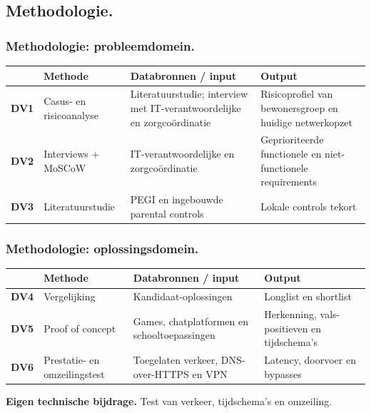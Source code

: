 \documentclass[aspectratio=169]{beamer}
\begin{document}
\subsection{Methodologie.}

\begin{frame}
    \frametitle{Methodologie: probleemdomein.}

    \footnotesize
    \begin{table}
        \renewcommand{\arraystretch}{1.4}
        \begin{tabular}{@{}lp{2.7cm}p{4cm}p{3.3cm}@{}}
            \toprule
            & \textbf{Methode} & \textbf{Databronnen / input} &
            \textbf{Output} \\
            \midrule
            \textbf{DV1} & Casus- en risicoanalyse &
            Literatuurstudie; interview met IT-verantwoordelijke en
            zorgcoördinatie &
            Risicoprofiel van bewonersgroep en huidige netwerkopzet \\
            \midrule
            \textbf{DV2} & Interviews + MoSCoW &
            IT-verantwoordelijke en zorgcoördinatie &
            Geprioriteerde functionele en niet-functionele requirements \\
            \midrule
            \textbf{DV3} & Literatuurstudie &
            PEGI en ingebouwde parental controls &
            Lokale controls tekort \\
            \bottomrule
        \end{tabular}
    \end{table}
\end{frame}

\begin{frame}
    \frametitle{Methodologie: oplossingsdomein.}

    \footnotesize
    \begin{table}
        \renewcommand{\arraystretch}{1.4}
        \begin{tabular}{@{}lp{2.7cm}p{4cm}p{3.3cm}@{}}
            \toprule
            & \textbf{Methode} & \textbf{Databronnen / input} &
            \textbf{Output} \\
            \midrule
            \textbf{DV4} & Vergelijking &
            Kandidaat-oplossingen &
            Longlist en shortlist \\
            \midrule
            \textbf{DV5} & Proof of concept &
            Games, chatplatformen en schooltoepassingen &
            Herkenning, vals-positieven en tijdschema's \\
            \midrule
            \textbf{DV6} & Prestatie- en omzeilingstest &
            Toegelaten verkeer, DNS-over-HTTPS en VPN &
            Latency, doorvoer en bypasses \\
            \bottomrule
        \end{tabular}
    \end{table}

    \bigskip

    \textcolor{hggrey}{\textbf{Eigen technische bijdrage.}}
    Test van verkeer, tijdschema's en omzeiling.
\end{frame}
\end{document}
